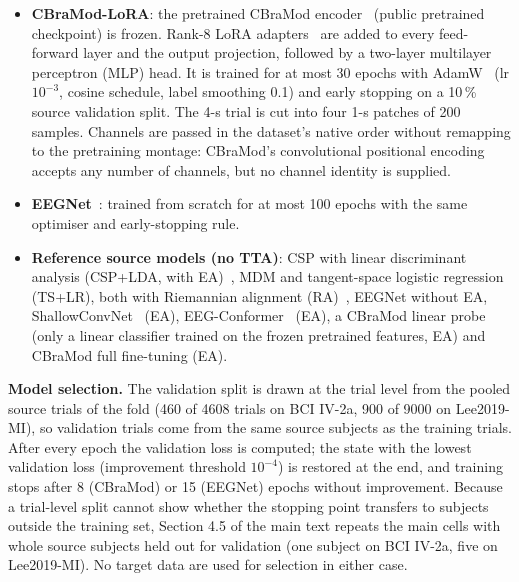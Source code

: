 \documentclass[preprint,12pt]{elsarticle}
\newcommand{\rev}[1]{#1}
\begin{document}
\begin{itemize}
\item \textbf{CBraMod-LoRA}: the pretrained CBraMod encoder~\cite{wang2025cbramod} (public pretrained checkpoint) is frozen. Rank-8 LoRA adapters~\cite{hu2022lora} are added to every feed-forward layer and the output projection, followed by a two-layer multilayer perceptron (MLP) head. It is trained for \rev{at most} 30 epochs with AdamW~\cite{loshchilov2019adamw} (lr $10^{-3}$, cosine schedule, label smoothing 0.1) and early stopping on a 10\,\% source validation split. \rev{The 4-s trial is cut into four 1-s patches of 200 samples. Channels are passed in the dataset's native order without remapping to the pretraining montage: CBraMod's convolutional positional encoding accepts any number of channels, but no channel identity is supplied.}
\item \textbf{EEGNet}~\cite{lawhern2018eegnet}: trained from scratch for \rev{at most} 100 epochs with the same optimiser and early-stopping rule.
\item \textbf{Reference source models (no TTA)}: CSP with linear discriminant analysis (CSP+LDA, with EA)~\cite{blankertz2008csp}, MDM and tangent-space logistic regression (TS+LR), both with Riemannian alignment (RA)~\cite{barachant2012mdm,barachant2013ts,zanini2018ra}, EEGNet without EA, ShallowConvNet~\cite{schirrmeister2017deep} (EA), EEG-Conformer~\cite{song2023conformer} (EA), a CBraMod linear probe (only a linear classifier trained on the frozen pretrained features, EA) and CBraMod full fine-tuning (EA).
\end{itemize}

\rev{\textbf{Model selection.} The validation split is drawn at the trial level from the pooled source trials of the fold (460 of 4608 trials on BCI IV-2a, 900 of 9000 on Lee2019-MI), so validation trials come from the same source subjects as the training trials. After every epoch the validation loss is computed; the state with the lowest validation loss (improvement threshold $10^{-4}$) is restored at the end, and training stops after 8 (CBraMod) or 15 (EEGNet) epochs without improvement. Because a trial-level split cannot show whether the stopping point transfers to subjects outside the training set, Section 4.5 of the main text repeats the main cells with whole source subjects held out for validation (one subject on BCI IV-2a, five on Lee2019-MI). No target data are used for selection in either case.}
\end{document}
